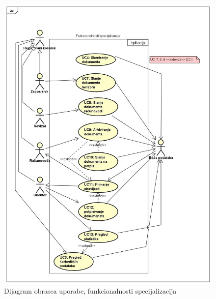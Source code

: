 				\begin{figure}[H]
					\includegraphics[scale=0.4]{slike/funkcionalnosti specijalizacija} %
					\centering
					\caption{ Dijagram obrasca uporabe, funkcionalnosti specijalizacija}
					\label{fig:promjene}
				\end{figure}

